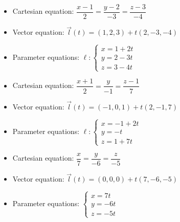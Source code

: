 \begin{Answer}
\begin{itemize}
            \end{itemize}
		\Question 
		\begin{itemize}
            \item Cartesian equation: $ \dfrac{x-1}{2} = \dfrac{y-2}{-3} = \dfrac{z-3}{-4}$ \\[0.1cm]
            \item Vector equation: $\vec l(t) = (1,2,3) + t (2,-3,-4)$ \\[0.1cm]
            \item Parameter equations: $\ell: \left\{ \begin{array}{l} x = 1+2t \\ y = 2-3t \\ z = 3-4t \end{array} \right.$\\[0.1cm]
            \end{itemize}
		\Question 
		\begin{itemize}
            \item Cartesian equation: $ \dfrac{x+1}{2} = \dfrac{y}{-1} = \dfrac{z-1}{7}$ \\[0.1cm]
            \item Vector equation: $\vec l(t) = (-1,0,1) + t (2,-1,7)$ \\[0.1cm]
            \item Parameter equations: $\ell: \left\{ \begin{array}{l} x = -1+2t \\ y = -t \\ z = 1+7t \end{array} \right.$\\[0.1cm]
            \end{itemize}
		\Question 
		\begin{itemize}
		    \item Cartesian equation: $\dfrac{x}{7} = \dfrac{y}{-6} = \dfrac{z}{-5} $ \\[0.2cm]  
            \item Vector equation: $\vec l(t) = (0,0,0) + t (7,-6,-5)$ \\[0.2cm] 
            \item Parameter equations: $\left\{ \begin{array}{l} x = 7t \\ y = -6t \\ z = -5t \end{array} \right.$
		\end{itemize}
		\Question 
		\begin{itemize}

\end{itemize}
\end{Answer}
